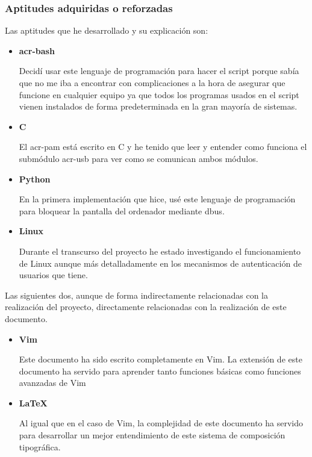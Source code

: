 \documentclass[titlepage, 12pt, a4paper]{article}
\begin{document}
\subsubsection{Aptitudes adquiridas o reforzadas}
Las aptitudes que he desarrollado y su explicación son:
\begin{itemize}
	\item{\textbf{\gls{acr-bash}}}\par Decidí usar este lenguaje de programación para hacer el \gls{script} porque sabía que no me iba a encontrar con complicaciones a la hora de asegurar que funcione en cualquier equipo ya que todos los programas usados en el script vienen instalados de forma predeterminada en la gran mayoría de sistemas.
	\item{\textbf{\gls{C}}}\par El \gls{acr-pam} está escrito en \gls{C} y he tenido que leer y entender como funciona el submódulo \gls{acr-usb} para ver como se comunican ambos módulos.
	\item{\textbf{\gls{Python}}}\par En la primera implementación que hice, usé este lenguaje de programación para bloquear la pantalla del ordenador mediante \gls{dbus}.
	\item{\textbf{\gls{Linux}}}\par Durante el transcurso del proyecto he estado investigando el funcionamiento de \gls{Linux} aunque más detalladamente en los mecanismos de autenticación de usuarios que tiene.
\end{itemize}
Las siguientes dos, aunque de forma indirectamente relacionadas con la realización del proyecto, directamente relacionadas con la realización de este documento.
\begin{itemize}
	\item{\textbf{\gls{Vim}}}\par Este documento ha sido escrito completamente en \gls{Vim}. La extensión de este documento ha servido para aprender tanto funciones básicas como funciones avanzadas de \gls{Vim}
	\item{\textbf{\LaTeX{}}}\par Al igual que en el caso de \gls{Vim}, la complejidad de este documento ha servido para desarrollar un mejor entendimiento de este sistema de composición tipográfica.
\end{itemize}
\end{document}
